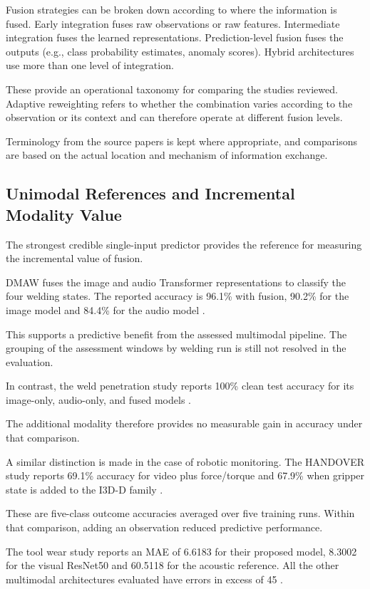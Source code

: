 Fusion strategies can be broken down according to where the information is fused. Early integration
fuses raw observations or raw features. Intermediate integration fuses the learned representations.
Prediction-level fusion fuses the outputs (e.g., class probability estimates, anomaly scores).
Hybrid architectures use more than one level of integration.

These provide an operational taxonomy for comparing the studies reviewed. Adaptive reweighting
refers to whether the combination varies according to the observation or its context and can
therefore operate at different fusion levels.

Terminology from the source papers is kept where appropriate, and comparisons are based on the
actual location and mechanism of information exchange.

\subsection{Unimodal References and Incremental Modality Value}

The strongest credible single-input predictor provides the reference for measuring the incremental value of fusion.

DMAW fuses the image and
audio Transformer representations to classify the four welding states. The reported accuracy is
96.1\% with fusion, 90.2\% for the image model and 84.4\% for the audio model \parencite[Table~III]{P003}.

This supports a predictive benefit from the assessed multimodal pipeline. The grouping of the
assessment windows by welding run is still not resolved in the evaluation.

In contrast, the weld penetration study reports 100\% clean test accuracy for its image-only,
audio-only, and fused models \parencite[Tables~1--3]{Hua2026Weld}.

The additional modality therefore provides no measurable gain in accuracy under that comparison.

A similar distinction is made in the case of robotic monitoring. The HANDOVER study reports 69.1\%
accuracy for video plus force/torque and 67.9\% when gripper state is added to the I3D-D family
\parencite[Table~III]{Thoduka2024Handover}.

These are five-class outcome accuracies averaged over five training runs. Within that comparison, adding an observation reduced predictive performance.

The tool wear study reports an MAE of 6.6183 for their proposed model, 8.3002 for the visual
ResNet50 and 60.5118 for the acoustic reference. All the other multimodal architectures evaluated
have errors in excess of 45 \parencite[Table~1]{P045}.

